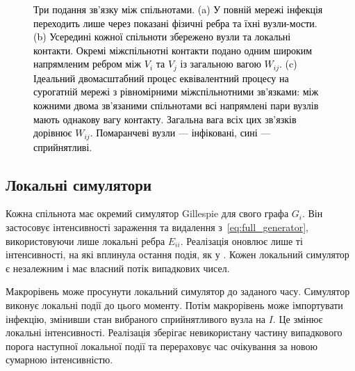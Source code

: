 \begin{figure}[tbp]
\caption{\textcolor{black}{Три подання зв'язку між спільнотами. (a) У повній мережі інфекція переходить лише через показані фізичні ребра та їхні вузли-мости. (b) Усередині кожної спільноти збережено вузли та локальні контакти. Окремі міжспільнотні контакти подано одним широким напрямленим ребром між $V_i$ та $V_j$ із загальною вагою $W_{ij}$. (c) Ідеальний двомасштабний процес еквівалентний процесу на сурогатній мережі з рівномірними міжспільнотними зв’язками: між кожними двома зв’язаними спільнотами всі напрямлені пари вузлів мають однакову вагу контакту. Загальна вага всіх цих зв'язків дорівнює $W_{ij}$. Помаранчеві вузли --- інфіковані, сині --- сприйнятливі.}}
\label{fig:schematic}
\end{figure}

\subsection{Локальні симулятори}
\label{sec:local}

Кожна спільнота має окремий симулятор Gillespie для свого графа $G_i$. Він застосовує інтенсивності зараження та видалення з~\eqref{eq:full_generator}, використовуючи лише локальні ребра $E_{ii}$. Реалізація оновлює лише ті інтенсивності, на які вплинула остання подія, як у \citet{kuryliak2025simulating}. Кожен локальний симулятор є незалежним і має власний потік випадкових чисел.

Макрорівень може просунути локальний симулятор до заданого часу. Симулятор виконує локальні події до цього моменту. Потім макрорівень може імпортувати інфекцію, змінивши стан вибраного сприйнятливого вузла на $I$. Це змінює локальні інтенсивності. Реалізація зберігає невикористану частину випадкового порога наступної локальної події та перераховує час очікування за новою сумарною інтенсивністю. 

